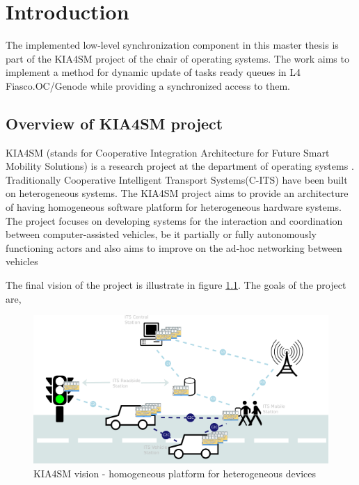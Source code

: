 
\chapter{Introduction}\label{chapter:introduction}

The implemented low-level synchronization component in this master thesis is part of the KIA4SM project of the chair of operating systems. The work aims to implement a method for dynamic update of tasks ready queues in L4 Fiasco.OC/Genode while providing a synchronized access to them.


\section{Overview of KIA4SM project}

KIA4SM (stands for Cooperative Integration Architecture for Future Smart Mobility Solutions) is a research project at the department of operating systems \cite{kia4sm}. Traditionally Cooperative Intelligent Transport Systems(C-ITS) have been built on heterogeneous systems. The KIA4SM project aims to provide an architecture of having homogeneous software platform for heterogeneous hardware systems. The project focuses on developing systems for the interaction and coordination between
computer-assisted vehicles, be it partially or fully autonomously functioning actors and also aims to improve on the ad-hoc networking between vehicles

The final vision of the project is illustrate in figure \ref{kia4sm}. The goals of the project are,

\begin{figure}[h]
  \centering
  \includegraphics[scale = 1]{figures/kia4sm_vision.png}
  \caption{KIA4SM vision - homogeneous platform for heterogeneous devices \cite{kia4sm}} \label{kia4sm}
\end{figure}

